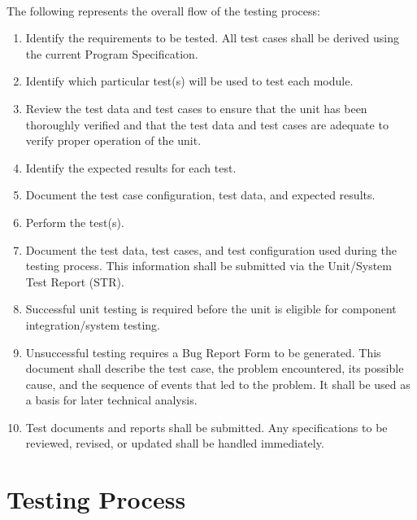 \documentclass[12pts]{scrreprt}
\begin{document}
\paragraph{}
The following represents the overall flow of the testing process:
\begin{enumerate}
    \item Identify the requirements to be tested. All test cases shall be derived using the current Program Specification.
    \item Identify which particular test(s) will be used to test each module.
    \item Review the test data and test cases to ensure that the unit has been thoroughly verified and that the test data and test cases are adequate to verify proper operation of the unit.
    \item Identify the expected results for each test.
    \item Document the test case configuration, test data, and expected results.
    \item Perform the test(s).
    \item Document the test data, test cases, and test configuration used during the testing process. This information shall be submitted via the Unit/System Test Report (STR).
    \item Successful unit testing is required before the unit is eligible for component integration/system testing.
    \item Unsuccessful testing requires a Bug Report Form to be generated. This document shall describe the test case, the problem encountered, its possible cause, and the sequence of events that led to the problem. It shall be used as a basis for later technical analysis.
    \item Test documents and reports shall be submitted. Any specifications to be reviewed, revised, or updated shall be handled immediately.
\end{enumerate}

\section{Testing Process}
\end{document}

